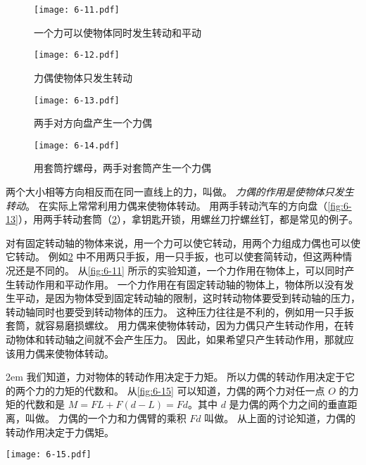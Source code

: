 \begin{figure}
	\begin{minipage}[b]{0.52\linewidth}\centering
    \texttt{[image: 6-11.pdf]}
    \caption{一个力可以使物体同时发生转动和平动}\label{fig:6-11}
	\end{minipage}%
	\begin{minipage}[b]{0.48\linewidth}\centering
    \texttt{[image: 6-12.pdf]}
    \caption{力偶使物体只发生转动}\label{fig:6-12}
	\end{minipage}
\end{figure}
\begin{figure}
  \begin{minipage}[b]{0.41\linewidth}\centering
		\texttt{[image: 6-13.pdf]}
		\caption{两手对方向盘产生一个力偶}\label{fig:6-13}
	\end{minipage}
	\begin{minipage}[b]{0.57\linewidth}\centering
		\texttt{[image: 6-14.pdf]}
    \caption{用套筒拧螺母，两手对套筒产生一个力偶}\label{fig:6-14}
	\end{minipage}
\end{figure}

两个大小相等方向相反而在同一直线上的力，叫做。
\emph{力偶的作用是使物体只发生转动}。
在实际上常常利用力偶来使物体转动。
用两手转动汽车的方向盘（\cref{fig:6-13}），用两手转动套筒（\cref{fig:6-14}），拿钥匙开锁，用螺丝刀拧螺丝钉，都是常见的例子。

对有固定转动轴的物体来说，用一个力可以使它转动，用两个力组成力偶也可以使它转动。
例如\cref{fig:6-14} 中不用两只手扳，用一只手扳，也可以使套简转动，但这两种情况还是不同的。
从\cref{fig:6-11} 所示的实验知道，一个力作用在物体上，可以同时产生转动作用和平动作用。
一个力作用在有固定转动轴的物体上，物体所以没有发生平动，是因为物体受到固定转动轴的限制，这时转动物体要受到转动轴的压力，转动轴同时也要受到转动物体的压力。
这种压力往往是不利的，例如用一只手扳套筒，就容易磨损螺纹。
用力偶来使物体转动，因为力偶只产生转动作用，在转动物体和转动轴之间就不会产生压力。
因此，如果希望只产生转动作用，那就应该用力偶来使物体转动。

\medskip\noindent
\begin{minipage}{0.55\linewidth}\parindent2em
我们知道，力对物体的转动作用决定于力矩。
所以力偶的转动作用决定于它的两个力的力矩的代数和。
从\cref{fig:6-15} 可以知道，力偶的两个力对任一点 $O$ 的力矩的代数和是 $M=FL+F(d-L)=Fd$。其中 $d$ 是力偶的两个力之间的垂直距离，叫做。
力偶的一个力和力偶臂的乘积 $Fd$ 叫做。
从上面的讨论知道，力偶的转动作用决定于力偶矩。
\end{minipage}\hfill
\begin{minipage}{0.4\linewidth}\centering
  \begin{figurehere}
    \texttt{[image: 6-15.pdf]}
    \caption{}\label{fig:6-15}
  \end{figurehere}
\end{minipage}

